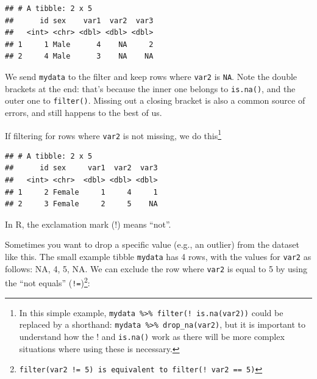 \documentclass[
  12pt,
  krantz2]{krantz}
\makeatletter
\newenvironment{Shaded}{\begin{snugshade}}{\end{snugshade}}
\newcommand{\DecValTok}[1]{\textcolor[rgb]{0.00,0.00,0.81}{#1}}
\newcommand{\KeywordTok}[1]{\textcolor[rgb]{0.13,0.29,0.53}{\textbf{#1}}}
\newcommand{\NormalTok}[1]{#1}
\newcommand{\OperatorTok}[1]{\textcolor[rgb]{0.81,0.36,0.00}{\textbf{#1}}}
\newcommand{\StringTok}[1]{\textcolor[rgb]{0.31,0.60,0.02}{#1}}
\newenvironment{kframe}{%
\medskip{}
\setlength{\fboxsep}{.8em}
 \def\at@end@of@kframe{}%
 \ifinner\ifhmode%
  \def\at@end@of@kframe{\end{minipage}}%
  \begin{minipage}{\columnwidth}%
 \fi\fi%
 \def\FrameCommand##1{\hskip\@totalleftmargin \hskip-\fboxsep
 \colorbox{shadecolor}{##1}\hskip-\fboxsep
     \hskip-\linewidth \hskip-\@totalleftmargin \hskip\columnwidth}%
 \MakeFramed {\advance\hsize-\width
   \@totalleftmargin\z@ \linewidth\hsize
   \@setminipage}}%
 {\par\unskip\endMakeFramed%
 \at@end@of@kframe}
\renewenvironment{Shaded}{\begin{kframe}}{\end{kframe}}
\makeatother
\begin{document}
\begin{verbatim}
## # A tibble: 2 x 5
##      id sex    var1  var2  var3
##   <int> <chr> <dbl> <dbl> <dbl>
## 1     1 Male      4    NA     2
## 2     4 Male      3    NA    NA
\end{verbatim}

We send \texttt{mydata} to the filter and keep rows where \texttt{var2} is \texttt{NA}.
Note the double brackets at the end: that's because the inner one belongs to \texttt{is.na()}, and the outer one to \texttt{filter()}.
Missing out a closing bracket is also a common source of errors, and still happens to the best of us.

If filtering for rows where \texttt{var2} is not missing, we do this\footnote{In this simple example, \texttt{mydata\ \%\textgreater{}\%\ filter(!\ is.na(var2))} could be replaced by a shorthand: \texttt{mydata\ \%\textgreater{}\%\ drop\_na(var2)}, but it is important to understand how the ! and \texttt{is.na()} work as there will be more complex situations where using these is necessary.}

\begin{Shaded}
\end{Shaded}

\begin{verbatim}
## # A tibble: 2 x 5
##      id sex     var1  var2  var3
##   <int> <chr>  <dbl> <dbl> <dbl>
## 1     2 Female     1     4     1
## 2     3 Female     2     5    NA
\end{verbatim}

In R, the exclamation mark (!) means ``not''.

Sometimes you want to drop a specific value (e.g., an outlier) from the dataset like this.
The small example tibble \texttt{mydata} has 4 rows, with the values for \texttt{var2} as follows: NA, 4, 5, NA.
We can exclude the row where \texttt{var2} is equal to 5 by using the ``not equals'' (\texttt{!=})\footnote{\texttt{filter(var2\ !=\ 5)\ is\ equivalent\ tolter(!\ var2\ ==\ 5)}}:

\begin{Shaded}
\end{Shaded}
\end{document}
